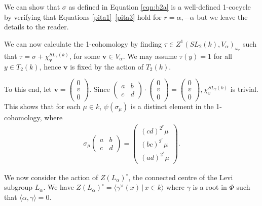 We can show that $\sigma$ as defined in Equation \ref{eqn:b2a} is a well-defined 1-cocycle by verifying that Equations \ref{pita1}--\ref{pita3} hold for $r=\alpha, -\alpha$ but we leave the details to the reader.

We can now calculate the 1-cohomology by finding $\tau\in Z^1(SL_2(k), V_\alpha)_{\omega_r}$ such that $\tau = \sigma + \chi^{SL_2(k)}_\mathbf{v}$, for some $\mathbf{v}\in V_\alpha$. We may assume $\tau(y) = 1$ for all $y \in T_2(k)$, hence $\mathbf{v}$ is fixed by the action of $T_2(k)$. 

To this end, let $\mathbf{v} = \left(\begin{matrix}0\\v\\0\end{matrix}\right)$. Since
	$\left(\begin{matrix}a & b\\c & d\end{matrix}\right) \cdot \left(\begin{matrix}0\\v\\0\end{matrix}\right) =
	\left(\begin{matrix}0\\v\\0\end{matrix}\right),
\chi^{SL_2(k)}_v$ is trivial.
This shows that for each $\mu\in k$, $\psi(\sigma_\mu)$ is a distinct element in the 1-cohomology, where
\begin{align*}
	\sigma_\mu\left(\begin{matrix}a & b\\c & d\end{matrix}\right) = \left(\begin{matrix}(cd)^{2^r}\mu\\(bc)^{2^r}\mu\\(ad)^{2^r}\mu\end{matrix}\right).
\end{align*}

We now consider the action of $Z(L_\alpha)^\circ$, the connected centre of the Levi subgroup $L_\alpha$. We have $Z(L_\alpha)^\circ = \langle \gamma^\vee(x)\,|\,x \in k \rangle$ where $\gamma$ is a root in $\Phi$ such that $\langle \alpha, \gamma \rangle = 0$.

